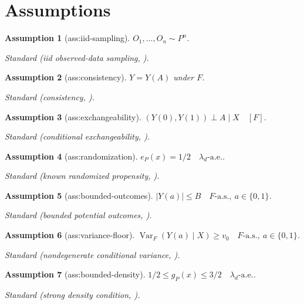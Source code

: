 \documentclass{article}
\newtheorem{assumption}{Assumption}
\begin{document}
\section{Assumptions}

\begin{assumption}[ass:iid-sampling]\label{ass:iid-sampling}
\(O_1,\ldots,O_n\sim P^n\).
\par\smallskip\noindent\emph{Standard} (iid observed-data sampling, \cite{LuedtkeVanderLaan2016}).
\end{assumption}

\begin{assumption}[ass:consistency]\label{ass:consistency}
\(Y=Y(A)\) under \(F\).
\par\smallskip\noindent\emph{Standard} (consistency, \cite{LuedtkeVanderLaan2016}).
\end{assumption}

\begin{assumption}[ass:exchangeability]\label{ass:exchangeability}
\((Y(0),Y(1))\perp A\mid X\quad[F]\).
\par\smallskip\noindent\emph{Standard} (conditional exchangeability, \cite{LuedtkeVanderLaan2016}).
\end{assumption}

\begin{assumption}[ass:randomization]\label{ass:randomization}
\(e_P(x)=1/2\quad\lambda_d\text{-a.e.}\).
\par\smallskip\noindent\emph{Standard} (known randomized propensity, \cite{LuedtkeVanderLaan2016}).
\end{assumption}

\begin{assumption}[ass:bounded-outcomes]\label{ass:bounded-outcomes}
\(|Y(a)|\le B\quad F\text{-a.s.},\ a\in\{0,1\}\).
\par\smallskip\noindent\emph{Standard} (bounded potential outcomes, \cite{LuedtkeVanderLaan2016}).
\end{assumption}

\begin{assumption}[ass:variance-floor]\label{ass:variance-floor}
\(\operatorname{Var}_F(Y(a)\mid X)\ge v_0\quad F\text{-a.s.},\ a\in\{0,1\}\).
\par\smallskip\noindent\emph{Standard} (nondegenerate conditional variance, \cite{LuedtkeVanderLaan2016}).
\end{assumption}

\begin{assumption}[ass:bounded-density]\label{ass:bounded-density}
\(1/2\le g_P(x)\le3/2\quad\lambda_d\text{-a.e.}\).
\par\smallskip\noindent\emph{Standard} (strong density condition, \cite{AudibertTsybakov2007}).
\end{assumption}
\end{document}
